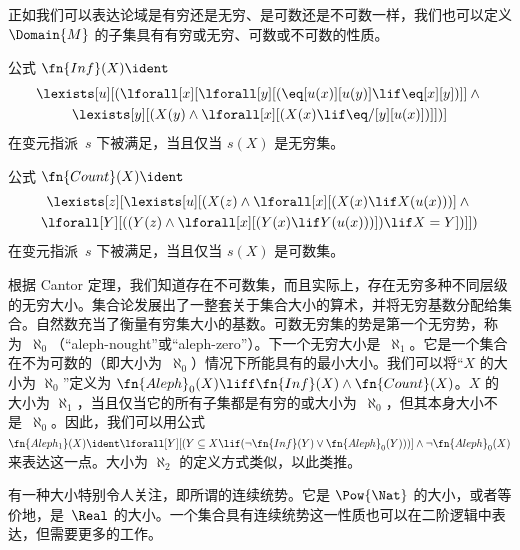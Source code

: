 \documentclass[../../../include/open-logic-section]{subfiles}
\begin{document}


\begin{explain}
正如我们可以表达论域是有穷还是无穷、是可数还是不可数一样，我们也可以定义 $\Domain{M}$ 的子集具有有穷或无穷、可数或不可数的性质。
\end{explain}

\begin{prop}
公式 $\fn{Inf}(X) \ident$
\begin{multline*}
\lexists[u][(\lforall[x][\lforall[y][(\eq[u(x)][u(y)] \lif
      \eq[x][y])]] \land {} \\\lexists[y][(X(y) \land \lforall[x][(X(x)
      \lif \eq/[y][u(x)])]])]
\end{multline*}
在变元指派~$s$ 下被满足，当且仅当 $s(X)$ 是无穷集。
\end{prop}

\begin{prop}
公式 $\fn{Count}(X) \ident $
\begin{multline*}
\lexists[z][\lexists[u][(X(z) \land
    \lforall[x][(X(x) \lif X(u(x)))] \land {} \\ \lforall[Y][((Y(z) \land
      \lforall[x][(Y(x) \lif Y(u(x)))]) \lif X = Y])]])
\end{multline*}
在变元指派~$s$ 下被满足，当且仅当 $s(X)$ 是可数集。
\end{prop}

根据 Cantor 定理，我们知道存在不可数集，而且实际上，存在无穷多种不同层级的无穷大小。集合论发展出了一整套关于集合大小的算术，并将无穷基数分配给集合。自然数充当了衡量有穷集大小的基数。可数无穷集的势是第一个无穷势，称为~$\aleph_0$（“aleph-nought”或“aleph-zero”）。下一个无穷大小是~$\aleph_1$。它是一个集合在不为可数的（即大小为~$\aleph_0$）情况下所能具有的最小大小。我们可以将“$X$ 的大小为 $\aleph_0$”定义为
$\fn{Aleph}_0(X) \liff \fn{Inf}(X) \land \fn{Count}(X)$。$X$ 的大小为 $\aleph_1$，当且仅当它的所有子集都是有穷的或大小为~$\aleph_0$，但其本身大小不是~$\aleph_0$。因此，我们可以用公式 $\fn{Aleph_1}(X) \ident \lforall[Y][(Y \subseteq X \lif
  (\lnot\fn{Inf}(Y) \lor \fn{Aleph}_0(Y)))] \land \lnot
\fn{Aleph}_0(X)$ 来表达这一点。大小为 $\aleph_2$ 的定义方式类似，以此类推。

有一种大小特别令人关注，即所谓的连续统势。它是 $\Pow{\Nat}$ 的大小，或者等价地，是~$\Real$ 的大小。一个集合具有连续统势这一性质也可以在二阶逻辑中表达，但需要更多的工作。
\end{document}
